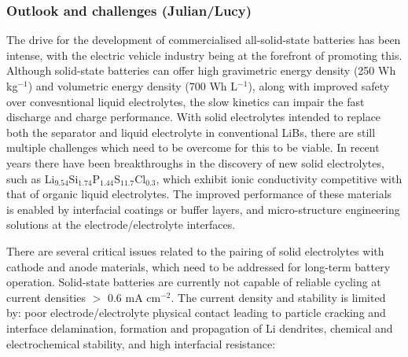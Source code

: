 \documentclass[../main.tex]{subfiles}
\begin{document}
\subsubsection{Outlook and challenges (Julian/Lucy)}
\label{sec:outlook_electrolytes}
The drive for the development of commercialised all-solid-state batteries has been intense, with the electric vehicle industry being at the forefront of promoting this.\cite{Woods_2021} Although solid-state batteries can offer high gravimetric energy density (250 Wh kg$^{-1}$) and volumetric energy density (700 Wh L$^{-1}$), along with improved safety over convesntional liquid electrolytes, the slow kinetics can impair the fast discharge and charge performance. With solid electrolytes intended to replace both the separator and liquid electrolyte in conventional LiBs, \cite{schnell2020solid} there are still multiple challenges which need to be overcome for this to be viable. In recent years there have been breakthroughs in the discovery of new solid electrolytes, such as Li$_{9.54}$Si$_{1.74}$P$_{1.44}$S$_{11.7}$Cl$_{0.3}$, \cite{kato2016high} which exhibit ionic conductivity competitive with that of organic liquid electrolytes. The improved performance of these materials is enabled by interfacial coatings or buffer layers, and micro-structure engineering solutions at the electrode/electrolyte interfaces.  \cite{kim2021solid}

There are several critical issues related to the pairing of solid electrolytes with cathode and anode materials, which need to be addressed for long-term battery operation. Solid-state batteries are currently not capable of reliable cycling at current densities $>$ 0.6 mA cm$^{-2}$\cite{famprikis_fundamentals_2019, Albertus2018}. The current density and stability is limited by: poor electrode/electrolyte physical contact leading to particle cracking and interface delamination, formation and propagation of Li dendrites, chemical and electrochemical stability, and high interfacial resistance: \cite{famprikis_fundamentals_2019} 
\end{document}
